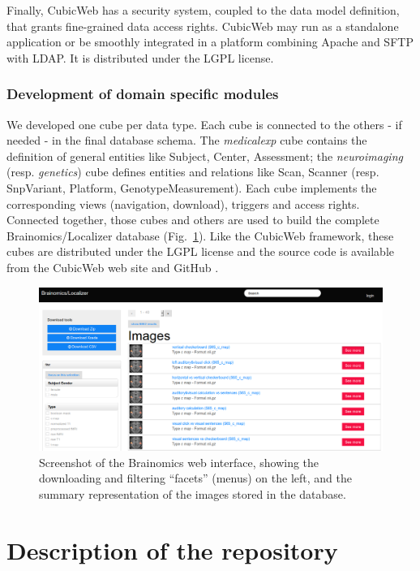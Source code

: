 \documentclass[review]{elsarticle}
\begin{document}
Finally, CubicWeb has a security system, coupled to the data model definition, that grants fine-grained data access rights. CubicWeb may run as a standalone application or be smoothly integrated in a platform combining Apache and SFTP with LDAP. It is distributed under the LGPL license.


\subsubsection{Development of domain specific modules}

We developed one cube per data type. Each cube is connected to the others - if needed - in the final database schema. The \textit{medicalexp} cube contains the definition of general entities like Subject, Center, Assessment; the \textit{neuroimaging} (resp. \textit{genetics}) cube defines entities and relations like Scan, Scanner (resp. SnpVariant, Platform, GenotypeMeasurement). Each cube implements the corresponding views (navigation, download), triggers and access rights. Connected together, those cubes and others are used to build the complete Brainomics/Localizer database (Fig.~\ref{fig:ui}). Like the CubicWeb framework, these cubes are distributed under the LGPL license and the source code is available from the CubicWeb web site \cite{CubicWeb} and GitHub \cite{Localizer}.

\begin{figure}[ht!]
    \includegraphics[width=\textwidth]{ui1}
    \caption{Screenshot of the Brainomics web interface, showing the downloading and filtering ``facets'' (menus) on the left, and the summary representation of the images stored in the database.}
    \label{fig:ui}
\end{figure}


\section{Description of the repository}
\end{document}
